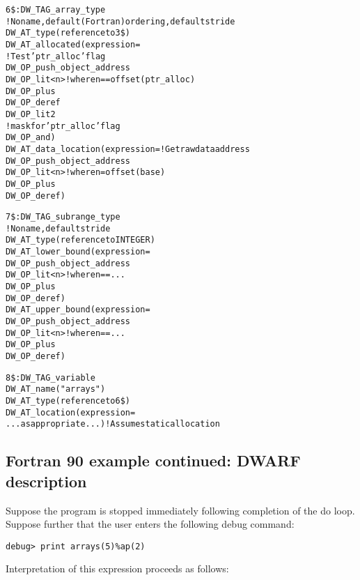 \begin{alltt}
6\$: DW\_TAG\_array\_type
        ! No name, default (Fortran) ordering, default stride
        DW\_AT\_type(reference to 3\$)
        DW\_AT\_allocated(expression=
             ! Test 'ptr\_alloc' flag
            DW\_OP\_push\_object\_address
            DW\_OP\_lit<n> ! where n == offset(ptr\_alloc)
            DW\_OP\_plus
            DW\_OP\_deref
            DW\_OP\_lit2
             ! mask for 'ptr\_alloc' flag
            DW\_OP\_and)
        DW\_AT\_data\_location(expression= ! Get raw data address
            DW\_OP\_push\_object\_address
            DW\_OP\_lit<n> ! where n = offset(base)
            DW\_OP\_plus
            DW\_OP\_deref)

7\$: DW\_TAG\_subrange\_type
        ! No name, default stride
        DW\_AT\_type(reference to INTEGER)
        DW\_AT\_lower\_bound(expression=
            DW\_OP\_push\_object\_address
            DW\_OP\_lit<n> ! where n == ...
            DW\_OP\_plus
            DW\_OP\_deref)
        DW\_AT\_upper\_bound(expression=
            DW\_OP\_push\_object\_address
            DW\_OP\_lit<n> ! where n == ...
            DW\_OP\_plus
            DW\_OP\_deref)

8\$: DW\_TAG\_variable
        DW\_AT\_name("arrays")
        DW\_AT\_type(reference to 6\$)
        DW\_AT\_location(expression=
            ...as appropriate...) ! Assume static allocation
\end{alltt}

\subsection{Fortran 90 example continued: DWARF description}
\label{app:fortran90examplecontinueddwarfdescription}

Suppose the program is stopped immediately following completion
of the do loop. Suppose further that the user enters the
following debug command:

\begin{lstlisting}
debug> print arrays(5)%ap(2)
\end{lstlisting}

Interpretation of this expression proceeds as follows:


